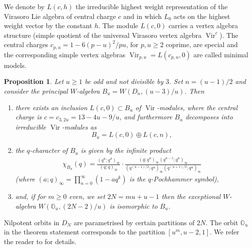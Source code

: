 \documentclass[12pt]{amsart}
\theoremstyle{plain}
\newtheorem{prop}[thm]{Proposition}
\theoremstyle{definition}
\numberwithin{equation}{section}
\DeclareMathOperator{\Vir}{Vir}
\newcommand{\mbo}{\mathbb{O}}
\begin{document}
We denote by $L(c, h)$ the irreducible highest weight representation of the Virasoro Lie algebra of central charge $c$ and in which $L_0$ acts on the highest weight vector by the constant $h$. The module $L(c, 0)$ carries a vertex algebra structure (simple quotient of the universal Virasoro vertex algebra $\Vir^c$). The central charges $c_{p, u} = 1-6(p-u)^2/pu$, for $p, u \geq 2$ coprime, are special and the corresponding simple vertex algebras $\Vir_{p, u} =L(c_{p, u}, 0)$ are called minimal models.
\begin{prop}
Let $u \geq 1$ be odd and not divisible by $3$. Set $n = (u-1)/2$ and consider the principal $W$-algebra $B_u = W(D_n, (u-3)/u)$. Then
\begin{enumerate}
\item there exists an inclusion $L(c, 0) \subset B_u$ of $\Vir$-modules, where the central charge is $c = c_{3, 2u} = 13 - 4u - 9/u$, and furthermore $B_u$ decomposes into irreducible $\Vir$-modules as
\[
B_u = L(c, 0) \oplus L(c, n),
\]

\item the $q$-character of $B_u$ is given by the infinite product
\begin{align*}
\chi_{B_u}(q) = \frac{(q^{u}; q^{u})_\infty}{(q;q)_{\infty}} \cdot \frac{(q; q^{u})_\infty (q^{u-1}; q^{u})_\infty}{(q^{(u-1)/2}; q^{u})_\infty(q^{(u+1)/2}; q^{u})_\infty}
\end{align*}
\textup{(}where $(a;q)_\infty = \prod_{n=0}^\infty (1-aq^k)$ is the $q$-Pochhammer symbol\textup{)},

\item and, if for $m \geq 0$ even, we set $2N = mu+u-1$ then the exceptional $W$-algebra $W(\mbo_u, (2N-2)/u)$ is isomorphic to $B_u$.
\end{enumerate}
\end{prop}

Nilpotent orbits in $D_N$ are parametrised by certain partitions of $2N$. The orbit $\mbo_u$ in the theorem statement corresponds to the partition $[u^m, u-2, 1]$. We refer the reader to \cite{CMcG} for details.
\end{document}
